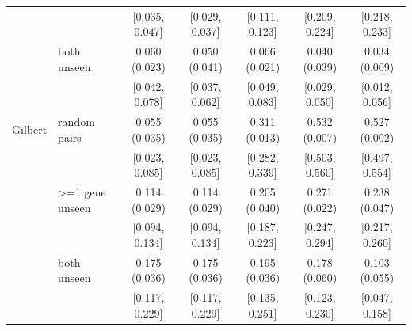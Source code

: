 \begin{tabular}{ll|ccccc}
 & & \scriptsize[0.035, 0.047] & \scriptsize[0.029, 0.037] & \scriptsize[0.111, 0.123] & \scriptsize[0.209, 0.224] & \scriptsize[0.218, 0.233] \\
 & both unseen & 0.060 (0.023) & 0.050 (0.041) & 0.066 (0.021) & 0.040 (0.039) & 0.034 (0.009) \\
 & & \scriptsize[0.042, 0.078] & \scriptsize[0.037, 0.062] & \scriptsize[0.049, 0.083] & \scriptsize[0.029, 0.050] & \scriptsize[0.012, 0.056] \\
\hline
Gilbert & random pairs & 0.055 (0.035) & 0.055 (0.035) & 0.311 (0.013) & 0.532 (0.007) & 0.527 (0.002) \\
 & & \scriptsize[0.023, 0.085] & \scriptsize[0.023, 0.085] & \scriptsize[0.282, 0.339] & \scriptsize[0.503, 0.560] & \scriptsize[0.497, 0.554] \\
 & >=1 gene unseen & 0.114 (0.029) & 0.114 (0.029) & 0.205 (0.040) & 0.271 (0.022) & 0.238 (0.047) \\
 & & \scriptsize[0.094, 0.134] & \scriptsize[0.094, 0.134] & \scriptsize[0.187, 0.223] & \scriptsize[0.247, 0.294] & \scriptsize[0.217, 0.260] \\
 & both unseen & 0.175 (0.036) & 0.175 (0.036) & 0.195 (0.036) & 0.178 (0.060) & 0.103 (0.055) \\
 & & \scriptsize[0.117, 0.229] & \scriptsize[0.117, 0.229] & \scriptsize[0.135, 0.251] & \scriptsize[0.123, 0.230] & \scriptsize[0.047, 0.158] \\
\hline
\end{tabular}
